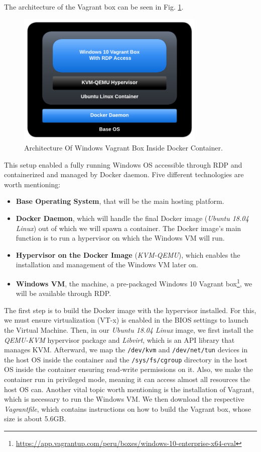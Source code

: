 The architecture of the Vagrant box can be seen in Fig. \ref{fig:windows_vagrant_box_architecture}. 

\begin{figure}[H]
    \includegraphics[width=9cm]{figures/vagrant_box_container_diagram.pdf}
    \caption{Architecture Of Windows Vagrant Box Inside Docker Container.}
    \label{fig:windows_vagrant_box_architecture}
\end{figure}

This setup enabled a fully running Windows OS accessible through RDP and containerized and managed by Docker daemon. Five different technologies are worth mentioning:

\begin{itemize}
    \item \textbf{Base Operating System}, that will be the main hosting platform.
    \item \textbf{Docker Daemon}, which will handle the final Docker image (\textit{Ubuntu 18.04 Linux}) out of which we will spawn a container. The Docker image's main function is to run a hypervisor on which the Windows VM will run.
    \item \textbf{Hypervisor on the Docker Image} (\textit{KVM-QEMU}), which enables the installation and management of the Windows VM later on.
    \item \textbf{Windows VM}, the machine, a pre-packaged Windows 10 Vagrant box\footnote{\url{https://app.vagrantup.com/peru/boxes/windows-10-enterprise-x64-eval}}, we will be available through RDP.
\end{itemize}

The first step is to build the Docker image with the hypervisor installed. For this, we must ensure virtualization (VT-x) is enabled in the BIOS settings to launch the Virtual Machine. Then, in our \textit{Ubuntu 18.04 Linux} image, we first install the \textit{QEMU-KVM} hypervisor package and \textit{Libvirt}, which is an API library that manages KVM. Afterward, we map the \texttt{/dev/kvm} and \texttt{/dev/net/tun} devices in the host OS inside the container and the \texttt{/sys/fs/cgroup} directory in the host OS inside the container ensuring read-write permissions on it. Also, we make the container run in privileged mode, meaning it can access almost all resources the host OS can. Another vital topic worth mentioning is the installation of Vagrant, which is necessary to run the Windows VM. We then download the respective \textit{Vagrantfile}, which contains instructions on how to build the Vagrant box, whose size is about 5.6GB.

